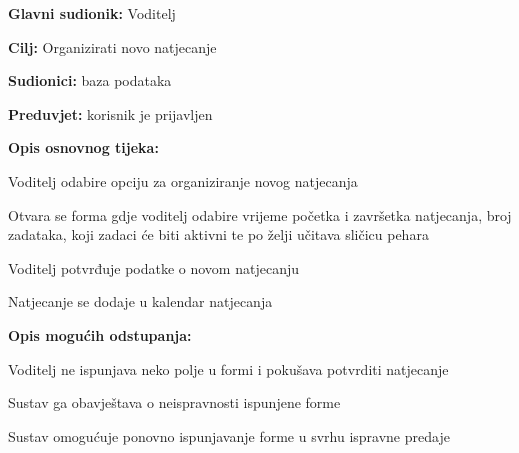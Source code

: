 					\noindent {}
					\begin{packed_item}
						
						\item \textbf{Glavni sudionik: }Voditelj
						\item \textbf{Cilj:} Organizirati novo natjecanje
						\item \textbf{Sudionici:} baza podataka
						\item \textbf{Preduvjet:} korisnik je prijavljen
						\item \textbf{Opis osnovnog tijeka:}
						
						\item[] \begin{packed_enum}
							\item Voditelj odabire opciju za organiziranje novog natjecanja
							\item Otvara se forma gdje voditelj odabire vrijeme početka i završetka natjecanja, broj zadataka, koji zadaci će biti aktivni te po želji učitava sličicu pehara
							\item Voditelj potvrđuje podatke o novom natjecanju
							\item Natjecanje se dodaje u kalendar natjecanja
							
						\end{packed_enum}
						
						\item  \textbf{Opis mogućih odstupanja:}
						\item[] \begin{packed_item}
							
							\item[2.a] Voditelj ne ispunjava neko polje u formi i pokušava potvrditi natjecanje
							\item[] \begin{packed_enum}
								
								\item Sustav ga obavještava o neispravnosti ispunjene forme
								\item Sustav omogućuje ponovno ispunjavanje forme u svrhu ispravne predaje
								
							\end{packed_enum}
						\end{packed_item}
					\end{packed_item}
										
